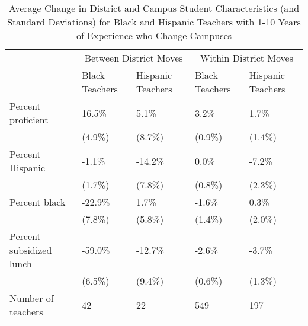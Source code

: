 \documentclass[]{article}
\begin{document}
\begin{table}[ht]
\centering
\begin{tabular}{lp{}p{}p{}p{}}
  \hline
 & \multicolumn{2}{c}{Between District Moves} & \multicolumn{2}{c}{Within District Moves}\\ \cline{2-5}
 & Black Teachers & Hispanic Teachers & Black Teachers & Hispanic Teachers \\
  \hline
Percent proficient & 16.5\% & 5.1\% & 3.2\% & 1.7\% \\ 
   & (4.9\%) & (8.7\%) & (0.9\%) & (1.4\%) \\ 
  Percent Hispanic & -1.1\% & -14.2\% & 0.0\% & -7.2\% \\ 
   & (1.7\%) & (7.8\%) & (0.8\%) & (2.3\%) \\ 
  Percent black & -22.9\% & 1.7\% & -1.6\% & 0.3\% \\ 
   & (7.8\%) & (5.8\%) & (1.4\%) & (2.0\%) \\ 
  Percent subsidized lunch & -59.0\% & -12.7\% & -2.6\% & -3.7\% \\ 
   & (6.5\%) & (9.4\%) & (0.6\%) & (1.3\%) \\ 
  Number of teachers & 42 & 22 & 549 & 197 \\ 
   \hline
\end{tabular}
\caption{Average Change in District and Campus Student Characteristics (and Standard Deviations) for Black and Hispanic Teachers with 1-10 Years of Experience who Change Campuses} 
\label{tbl:change_by_eth}
\end{table}
\end{document}
